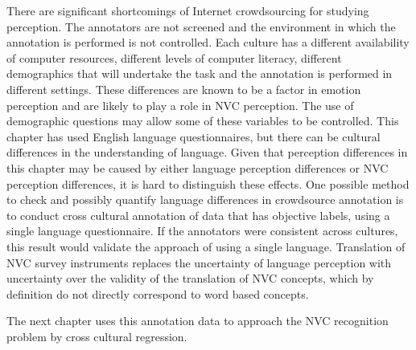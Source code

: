 There are significant shortcomings of Internet crowdsourcing for studying perception. The annotators are not screened and the environment in which the annotation is performed is not controlled. Each culture has a different availability of computer resources, different levels of computer literacy, different demographics that will undertake the task and the annotation is performed in different settings. These differences are known to be a factor in emotion perception and are likely to play a role in \ac{NVC} perception. The use of demographic questions may allow some of these variables to be controlled. This chapter has used English language questionnaires, but there can be cultural differences in the understanding of language. Given that perception differences in this chapter may be caused by either language perception differences or \ac{NVC} perception differences, it is hard to distinguish these effects. One possible method to check and possibly quantify language differences in crowdsource annotation is to conduct cross cultural annotation of data that has objective labels, using a single language questionnaire. If the annotators were consistent across cultures, this result would validate the approach of using a single language. Translation of \ac{NVC} survey instruments replaces the uncertainty of language perception with uncertainty over the validity of the translation of \ac{NVC} concepts, which by definition do not directly correspond to word based concepts.


The next chapter uses this \continuous annotation data to approach the \ac{NVC} recognition problem by cross cultural regression.
